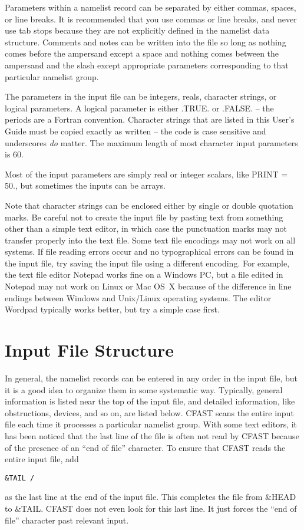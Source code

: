 Parameters within a namelist record can be separated by either commas, spaces, or line breaks. It is recommended that you use commas or line breaks, and never use tab stops because they are not explicitly defined in the namelist data structure. Comments and notes can be written into the file so long as nothing comes before the ampersand except a space and nothing comes between the ampersand and the slash except appropriate parameters corresponding to that particular namelist group.

The parameters in the input file can be integers, reals, character strings, or logical parameters. A logical parameter is either {\ct .TRUE.} or {\ct .FALSE.} -- the periods are a Fortran convention. Character strings that are listed in this User's Guide must be copied exactly as written -- the code is case sensitive and underscores {\em do} matter. The maximum length of most character input parameters is 60.

Most of the input parameters are simply real or integer scalars, like {\ct PRINT = 50.}, but sometimes the inputs can be arrays.

Note that character strings can be enclosed either by single or double quotation marks. Be careful not to create the input file by pasting text from something other than a simple text editor, in which case the punctuation marks may not transfer properly into the text file. Some text file encodings may not work on all systems. If file reading errors occur and no typographical errors can be found in the input file, try saving the input file using a different encoding. For example, the text file editor Notepad works fine on a Windows PC, but a file edited in Notepad may not work on Linux or Mac OS~X because of the difference in line endings between Windows and Unix/Linux operating systems. The editor Wordpad typically works better, but try a simple case first.


\section{Input File Structure}

In general, the namelist records can be entered in any order in the input file, but it is a good idea to organize them in some systematic way. Typically, general information is listed near the top of the input file, and detailed information, like obstructions, devices, and so on, are listed below. CFAST scans the entire input file each time it processes a particular namelist group. With some text editors, it has been noticed that the last line of the file is often not read by CFAST because of the presence of an ``end of file'' character. To ensure that CFAST reads the entire input file, add
\begin{lstlisting}
&TAIL /
\end{lstlisting}
as the last line at the end of the input file. This completes the file from {\ct \&HEAD} to {\ct \&TAIL}. CFAST does not even look for this last line. It just forces the ``end of file'' character past relevant input.

